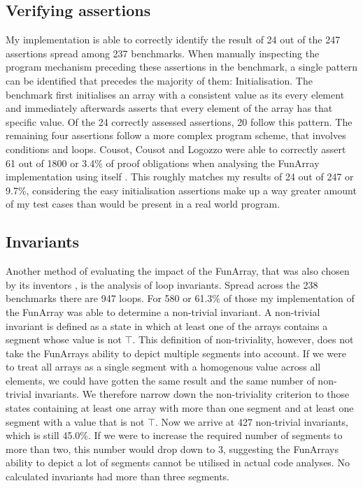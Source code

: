 \documentclass{report}
\begin{document}

\subsection{Verifying assertions}

My implementation is able to correctly identify the result of 24 out of the 247 assertions spread among 237 benchmarks. When manually inspecting the program mechanism preceding these assertions in the benchmark, a single pattern can be identified that precedes the majority of them: Initialisation. The benchmark first initialises an array with a consistent value as its every element and immediately afterwards asserts that every element of the array has that specific value. Of the 24 correctly assessed assertions, 20 follow this pattern. The remaining four assertions follow a more complex program scheme, that involves conditions and loops.
Cousot, Cousot and Logozzo were able to correctly assert 61 out of 1800 or 3.4\% of proof obligations when analysing the FunArray implementation using itself \cite{cousot2011}. This roughly matches my results of 24 out of 247 or 9.7\%, considering the easy initialisation assertions make up a way greater amount of my test cases than would be present in a real world program.

\subsection{Invariants}
Another method of evaluating the impact of the FunArray, that was also chosen by its inventors \cite{cousot2011}, is the analysis of loop invariants. Spread across the 238 benchmarks there are 947 loops. For 580 or 61.3\% of those my implementation of the FunArray was able to determine a non-trivial invariant. A non-trivial invariant is defined as a state in which at least one of the arrays contains a segment whose value is not $\top$.
This definition of non-triviality, however, does not take the FunArrays ability to depict multiple segments into account. If we were to treat all arrays as a single segment with a homogenous value across all elements, we could have gotten the same result and the same number of non-trivial invariants. We therefore narrow down the non-triviality criterion to those states containing at least one array with more than one segment and at least one segment with a value that is not $\top$. Now we arrive at 427 non-trivial invariants, which is still 45.0\%. 
If we were to increase the required number of segments to more than two, this number would drop down to 3, suggesting the FunArrays ability to depict a lot of segments cannot be utilised in actual code analyses. No calculated invariants had more than three segments.
\end{document}

